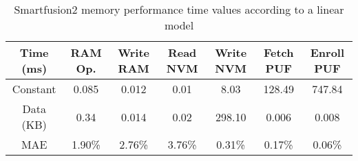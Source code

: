 \begin{table}[h!]
\centering
\def\arraystretch{1.5}
\begin{tabular}{|c|c|c|c|c|c|c|}
\hline
Time (ms) & RAM Op. & Write RAM & Read NVM & Write NVM & Fetch PUF & Enroll PUF \\ \hline
Constant  & 0.085     & 0.012     & 0.01     & 8.03      & 128.49    & 747.84  \\ \hline
Data (KB) & 0.34     & 0.014     & 0.02     & 298.10    & 0.006     & 0.008  \\ \hline
MAE       & 1.90\%    & 2.76\%    & 3.76\%   & 0.31\%    & 0.17\%    & 0.06\%  \\ \hline
\end{tabular}
\caption{Smartfusion2 memory performance time values according to a linear model}
\label{tab:core-model}
\end{table}
